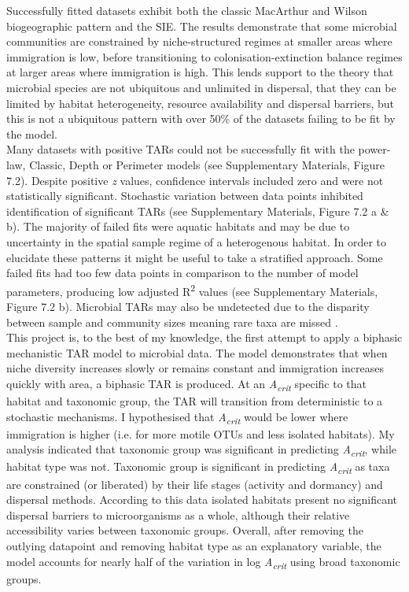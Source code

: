 \noindent Successfully fitted datasets exhibit both the classic MacArthur and Wilson \cite{MacArthurRobertH1967Ttoi} biogeographic pattern and the SIE. The results demonstrate that some microbial communities are constrained by niche-structured regimes at smaller areas where immigration is low, before transitioning to colonisation-extinction balance regimes at larger areas where immigration is high. This lends support to the theory that microbial species are not ubiquitous and unlimited in dispersal, that they can be limited by habitat heterogeneity, resource availability and dispersal barriers, but this is not a ubiquitous pattern with over 50\% of the datasets failing to be fit by the model. \\

\noindent Many datasets with positive TARs could not be successfully fit with the power-law, Classic, Depth or Perimeter models (see Supplementary Materials, Figure 7.2). Despite positive \textit{z} values, confidence intervals included zero and were not statistically significant. Stochastic variation between data points inhibited identification of significant TARs (see Supplementary Materials, Figure 7.2 a \& b). The majority of failed fits were aquatic habitats and may be due to uncertainty in the spatial sample regime of a heterogenous habitat. In order to elucidate these patterns it might be useful to take a stratified approach. Some failed fits had too few data points in comparison to the number of model parameters, producing low adjusted R\textsuperscript{2} values (see Supplementary Materials, Figure 7.2 b). Microbial TARs may also be undetected due to the disparity between sample and community sizes meaning rare taxa are missed \cite{woodcock2006taxa}.\\ 

\noindent This project is, to the best of my knowledge, the first attempt to apply a biphasic mechanistic TAR model to microbial data. The model demonstrates that when niche diversity increases slowly or remains constant and immigration increases quickly with area, a biphasic TAR is produced. At an \textit{A\textsubscript{crit}} specific to that habitat and taxonomic group, the TAR will transition from deterministic to a stochastic mechanisms. I hypothesised that \textit{A\textsubscript{crit}} would be lower where immigration is higher (i.e. for more motile OTUs and less isolated habitats). My analysis indicated that taxonomic group was significant in predicting \textit{A\textsubscript{crit}}, while habitat type was not. Taxonomic group is significant in predicting \textit{A\textsubscript{crit}} as taxa are constrained (or liberated) by their life stages (activity and dormancy) and dispersal methods. According to this data isolated habitats present no significant dispersal barriers to microorganisms as a whole, although their relative accessibility varies between taxonomic groups. Overall, after removing the outlying datapoint and removing habitat type as an explanatory variable, the model accounts for nearly half of the variation in log \textit{A\textsubscript{crit}} using broad taxonomic groups.\\

